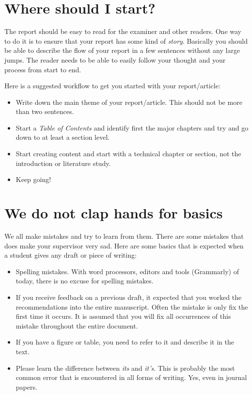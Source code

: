 \documentclass[12pt]{article}
\begin{document}
\section*{Where should I start?}
The report should be easy to read for the examiner and other readers.
One way to do it is to ensure that your report has some kind of \textit{story}.
Basically you should be able to describe the flow of your report in a few sentences without any large jumps.
The reader needs to be able to easily follow your thought and your process from start to end.

Here is a suggested workflow to get you started with your report/article:
\begin{itemize}
	\item Write down the main theme of your report/article.  This should not be more than two sentences.
	\item Start a \textit{Table of Contents} and identify first the major chapters and try and go down to at least a section level.
	\item Start creating content and start with a technical chapter or section, not the introduction or literature study.
	\item Keep going!
\end{itemize}

\section*{We do not clap hands for basics}
We all make mistakes and try to learn from them.
There are some mistakes that does make your supervisor very sad.
Here are some basics that is expected when a student gives any draft or piece of writing:
\begin{itemize}
	\item Spelling mistakes.  With word processors, editors and tools (Grammarly) of today, there is no excuse for spelling mistakes.
	\item If you receive feedback on a previous draft, it expected that you worked the recommendations into the entire manuscript.  Often the mistake is only fix the first time it occurs.  It is assumed that you will fix all occurrences of this mistake throughout the entire document.
	\item If you have a figure or table, you need to refer to it and describe it in the text.
	\item Please learn the difference between \textit{its} and \textit{it's}.
	This is probably the most common error that is encountered in all forms of writing.
	Yes, even in journal papers.
\end{itemize}
\end{document}
